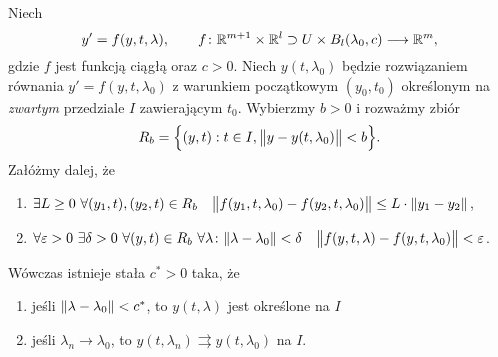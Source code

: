 \begin{theorem}
  Niech
  \[
    y' = f(y,t,\lambda), \qquad
    f \colon \R^{m + 1} \times \R^l \supset U \times B_l(\lambda_0,c) \longrightarrow \R^m,
  \]
  gdzie $f$ jest funkcją ciągłą oraz $c > 0$. Niech $y(t,\lambda_0)$ będzie rozwiązaniem równania
  $y' = f(y,t,\lambda_0)$ z warunkiem początkowym $(y_0, t_0)$ określonym na \emph{zwartym}
  przedziale $I$ zawierającym $t_0$. Wybierzmy $b > 0$ i rozważmy zbiór 
  \[
    R_b = \Big\{ (y,t) : t \in I, \norm[\big]{ y - y(t,\lambda_0) } < b \Big\}.
  \]
  Załóżmy dalej, że
  \begin{enumerate}
    \item $\exists L \geq 0 \ \forall (y_1,t),(y_2,t) \in R_b \quad
    \norm[\big]{ f(y_1,t,\lambda_0) - f(y_2,t,\lambda_0) } \leq L \cdot \norm{y_1 - y_2}$,
    \item $\forall \varepsilon > 0 \ \exists \delta > 0 \ \forall (y,t) \in R_b
    \ \forall \lambda \colon \norm{\lambda - \lambda_0} < \delta \quad \norm[\big]{ f(y,t,\lambda) 
    - f(y,t,\lambda_0) } < \varepsilon$.
  \end{enumerate}
  Wówczas istnieje stała $c^{\ast} > 0$ taka, że
  \begin{enumerate}
    \item jeśli $\norm{\lambda - \lambda_0} < c^{\ast}$, to $y(t,\lambda)$ jest określone na $I$
    \item jeśli $\lambda_n \to \lambda_0$, to $y(t,\lambda_n) \rightrightarrows y(t,\lambda_0)$ na $I$.
  \end{enumerate}
\end{theorem}